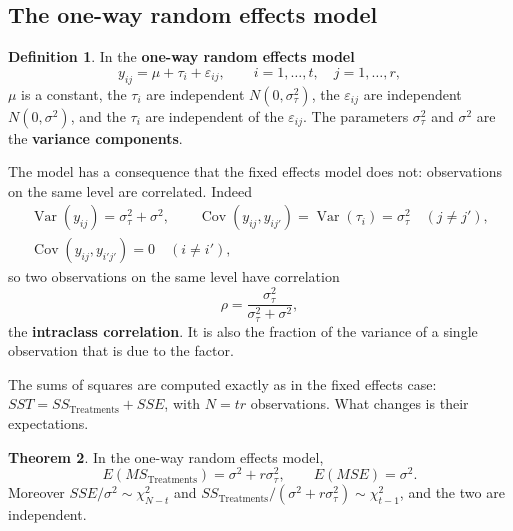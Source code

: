 \documentclass[11pt,a4paper]{article}
\numberwithin{equation}{section}
\DeclareMathOperator{\Var}{Var}
\DeclareMathOperator{\Cov}{Cov}
\theoremstyle{definition}
\newtheorem{thm}{Theorem}[subsection]
\newtheorem{defn}[thm]{Definition}
\begin{document}
\subsection{The one-way random effects model}
\begin{defn}
In the \textbf{one-way random effects model}
\[
y_{ij} = \mu + \tau_i + \varepsilon_{ij} , \qquad i = 1, \dots, t , \quad j = 1, \dots, r ,
\]
$\mu$ is a constant, the $\tau_i$ are independent $N(0, \sigma^2_\tau)$, the $\varepsilon_{ij}$ are independent $N(0, \sigma^2)$, and the $\tau_i$ are independent of the $\varepsilon_{ij}$. The
parameters $\sigma^2_\tau$ and $\sigma^2$ are the \textbf{variance components}.
\end{defn}

The model has a consequence that the fixed effects model does not: observations on the same level are correlated. Indeed
\begin{gather*}
\Var(y_{ij}) = \sigma^2_\tau + \sigma^2 , \qquad \Cov(y_{ij}, y_{ij'}) = \Var(\tau_i) = \sigma^2_\tau \quad (j \ne j') , \\
\Cov(y_{ij}, y_{i'j'}) = 0 \quad (i \ne i') ,
\end{gather*}
so two observations on the same level have correlation
\[
\rho = \frac{\sigma^2_\tau}{\sigma^2_\tau + \sigma^2} ,
\]
the \textbf{intraclass correlation}. It is also the fraction of the variance of a single observation that is due to the factor.

The sums of squares are computed exactly as in the fixed effects case: $SST = SS_{\mathrm{Treatments}} + SSE$, with $N = tr$ observations. What changes is their
expectations.

\begin{thm}\label{thm:oneway-random}
In the one-way random effects model,
\[
E(MS_{\mathrm{Treatments}}) = \sigma^2 + r\sigma^2_\tau , \qquad E(MSE) = \sigma^2 .
\]
Moreover $SSE/\sigma^2 \sim \chi^2_{N-t}$ and $SS_{\mathrm{Treatments}}/(\sigma^2 + r\sigma^2_\tau) \sim \chi^2_{t-1}$, and the two are independent.
\end{thm}
\end{document}
